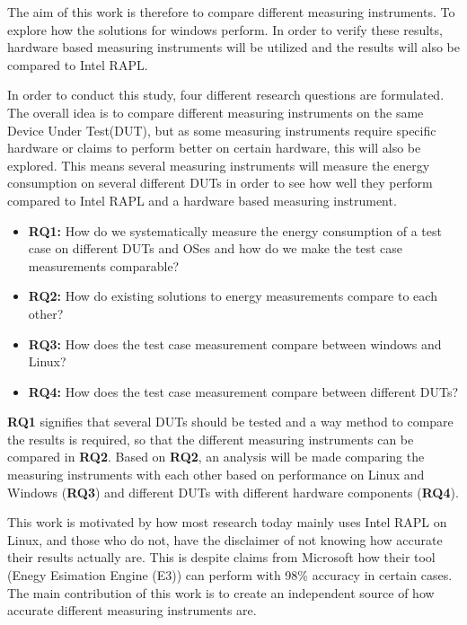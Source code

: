 The aim of this work is therefore to compare different measuring instruments. To explore how the solutions for windows perform. 
In order to verify these results, hardware based measuring instruments will be utilized and the results will also be compared to Intel RAPL.

In order to conduct this study, four different research questions are formulated. The overall idea is to compare different measuring instruments on the same Device Under Test(DUT), but as some measuring instruments require specific hardware or claims to perform better on certain hardware, this will also be explored. This means several measuring instruments will measure the energy consumption on several different DUTs in order to see how well they perform compared to Intel RAPL and a hardware based measuring instrument.


\begin{itemize}
    \item \textbf{RQ1:} How do we systematically measure the energy consumption of a test case on different DUTs and OSes and how do we make the test case measurements comparable?
    \item \textbf{RQ2:} How do existing solutions to energy measurements compare to each other?
    \item \textbf{RQ3:} How does the test case measurement compare between windows and Linux?
    \item \textbf{RQ4:} How does the test case measurement compare between different DUTs?
\end{itemize}

\textbf{RQ1} signifies that several DUTs should be tested and a way method to compare the results is required, so that the different measuring instruments can be compared in \textbf{RQ2}. Based on \textbf{RQ2}, an analysis will be made comparing the measuring instruments with each other based on performance on Linux and Windows (\textbf{RQ3}) and different DUTs with different hardware components (\textbf{RQ4}).

This work is motivated by how most research today mainly uses Intel RAPL on Linux\cite[]{Rasmussen2021,Pereira2017,Theilmann2022,Lindholt2022}, and those who do not, have the disclaimer of not knowing how accurate their results actually are\cite[]{Bruce2015ReducingEC, Ozturk2019, Unlu2021}. This is despite claims from Microsoft how their tool (Enegy Esimation Engine (E3)) can perform with 98\% accuracy in certain cases\cite[]{E3WinHec}. The main contribution of this work is to create an independent source of how accurate different measuring instruments are.





